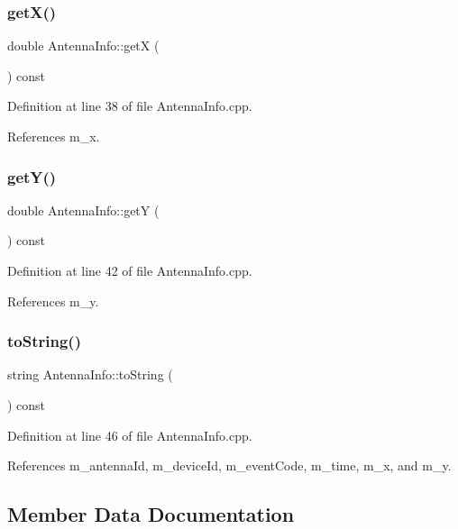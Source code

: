 \mbox{\label{class_antenna_info_a3817cba0231888dc5977105ace0faddb}} 
\subsubsection{getX()}
{\footnotesize\ttfamily double Antenna\+Info\+::getX (\begin{DoxyParamCaption}{ }\end{DoxyParamCaption}) const}



Definition at line 38 of file Antenna\+Info.\+cpp.



References m\+\_\+x.

\mbox{\label{class_antenna_info_aa385e3e85d783b81d69014a64b5fc94f}} 
\subsubsection{getY()}
{\footnotesize\ttfamily double Antenna\+Info\+::getY (\begin{DoxyParamCaption}{ }\end{DoxyParamCaption}) const}



Definition at line 42 of file Antenna\+Info.\+cpp.



References m\+\_\+y.

\mbox{\label{class_antenna_info_ab8c9e530f1a7adeb9ca4bb6bc4c4af1a}} 
\subsubsection{toString()}
{\footnotesize\ttfamily string Antenna\+Info\+::to\+String (\begin{DoxyParamCaption}{ }\end{DoxyParamCaption}) const}



Definition at line 46 of file Antenna\+Info.\+cpp.



References m\+\_\+antenna\+Id, m\+\_\+device\+Id, m\+\_\+event\+Code, m\+\_\+time, m\+\_\+x, and m\+\_\+y.



\subsection{Member Data Documentation}
\mbox{\label{class_antenna_info_a7776748da0e4d9f4b39683066806a897}} 
